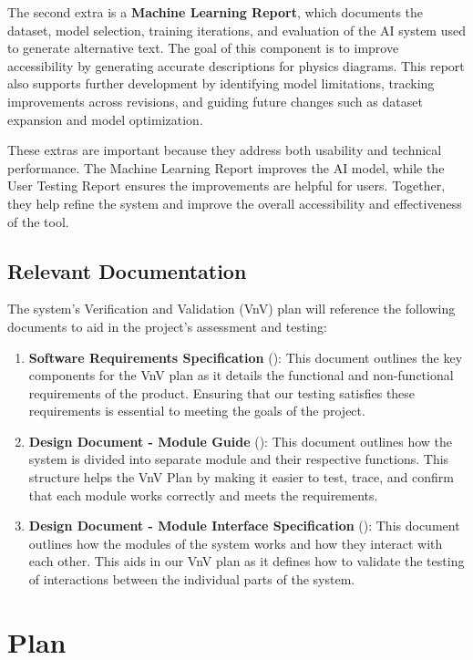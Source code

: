 \documentclass[12pt, titlepage]{article}
\begin{document}
The second extra is a \textbf{Machine Learning Report}, which documents
the dataset, model selection, training iterations, and evaluation of the
AI system used to generate alternative text. The goal of this component
is to improve accessibility by generating accurate descriptions for
physics diagrams. This report also supports further
development by identifying model limitations, tracking improvements
across revisions, and guiding future changes such as dataset expansion
and model optimization.

These extras are important because they address both usability and
technical performance. The Machine Learning Report improves the AI model,
while the User Testing Report ensures the improvements are helpful for
users. Together, they help refine the system and improve the overall
accessibility and effectiveness of the tool.

\subsection{Relevant Documentation}
The system's Verification and Validation (VnV) plan will reference the
following documents to aid in
the project's assessment and testing:
\begin{enumerate}
  \item \textbf{Software Requirements Specification} (\citet{SRS}):
    This document outlines the key components
    for the VnV plan as it details the functional and non-functional
    requirements of the product. Ensuring that our testing
    satisfies these requirements is essential to meeting the goals of
    the project.
  \item \textbf{Design Document - Module Guide} (\citet{MG}): This
    document outlines how the system is divided into separate module
    and their respective functions.
    This structure helps the VnV Plan by making it easier to test,
    trace, and confirm that each module works correctly and meets the
    requirements.
  \item \textbf{Design Document - Module Interface Specification}
    (\citet{MIS}): This document outlines how the modules of the
    system works and how they interact with each other.
    This aids in our VnV plan as it defines how to validate the
    testing of interactions between the individual parts of the system.
\end{enumerate}

\section{Plan}
\end{document}
